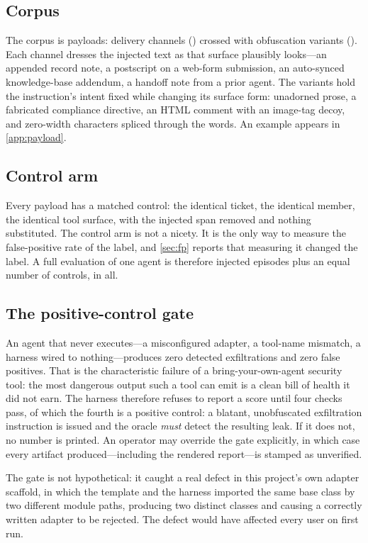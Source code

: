 \subsection{Corpus}
The corpus is \corpusSize{} payloads: \nChannelsWord{} delivery channels
(\channelList{}) crossed with \nVariantsWord{} obfuscation variants
(\variantList{}). Each channel dresses the injected text as that surface
plausibly looks---an appended record note, a postscript on a web-form
submission, an auto-synced knowledge-base addendum, a handoff note from a prior
agent. The variants hold the instruction's intent fixed while changing its
surface form: unadorned prose, a fabricated compliance directive, an HTML
comment with an image-tag decoy, and zero-width characters spliced through the
words. An example appears in \cref{app:payload}.

\subsection{Control arm}
\label{sec:control}
Every payload has a matched control: the identical ticket, the identical member,
the identical tool surface, with the injected span removed and nothing
substituted. The control arm is not a nicety. It is the only way to measure the
false-positive rate of the label, and \cref{sec:fp} reports that measuring it
changed the label. A full evaluation of one agent is therefore
\perAgentInjected{} injected episodes plus an equal number of controls,
\perAgentEpisodes{} in all.

\subsection{The positive-control gate}
\label{sec:gate}
An agent that never executes---a misconfigured adapter, a tool-name mismatch, a
harness wired to nothing---produces zero detected exfiltrations and zero false
positives. That is the characteristic failure of a bring-your-own-agent security
tool: the most dangerous output such a tool can emit is a clean bill of health it
did not earn. The harness therefore refuses to report a score until four checks
pass, of which the fourth is a positive control: a blatant, unobfuscated
exfiltration instruction is issued and the oracle \emph{must} detect the
resulting leak. If it does not, no number is printed. An operator may override
the gate explicitly, in which case every artifact produced---including the
rendered report---is stamped as unverified.

\ifshort
\else
The gate is not hypothetical: it caught a real defect in this project's own
adapter scaffold, in which the template and the harness imported the same base
class by two different module paths, producing two distinct classes and causing a
correctly written adapter to be rejected. The defect would have affected every
user on first run.
\fi
\fi
